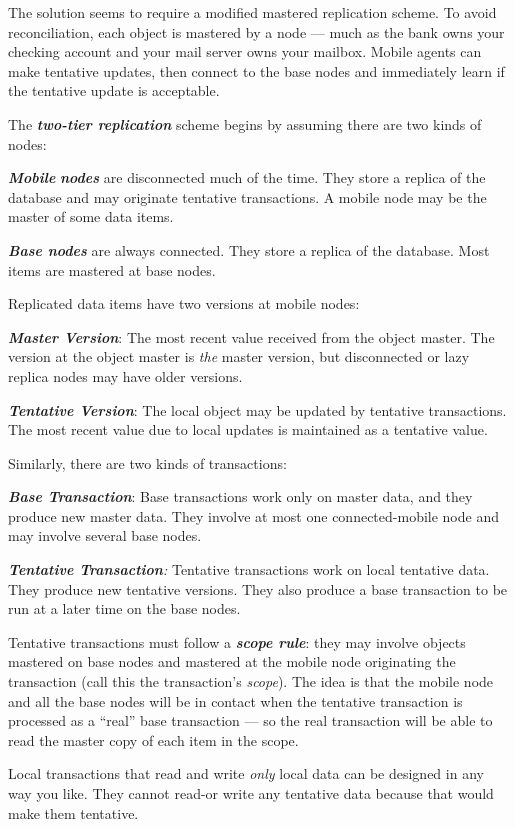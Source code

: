 \documentclass[a4paper,12pt,twoside,openright]{article}
\begin{document}
The solution seems to require a modified mastered replication scheme. To
avoid reconciliation, each object is mastered by a node --- much as the
bank owns your checking account and your mail server owns your mailbox.
Mobile agents can make tentative updates, then connect to the base nodes
and immediately learn if the tentative update is acceptable.

The \emph{\textbf{two-tier replication}} scheme begins by assuming there
are two kinds of nodes:

\emph{\textbf{Mobile}} \emph{\textbf{nodes}} are disconnected much of
the time. They store a replica of the database and may originate
tentative transactions. A mobile node may be the master of some data
items.

\emph{\textbf{Base nodes}} are always connected. They store a replica of
the database. Most items are mastered at base nodes.

Replicated data items have two versions at mobile nodes:

\emph{\textbf{Master Version}}: The most recent value received from the
object master. The version at the object master is \emph{the} master
version, but disconnected or lazy replica nodes may have older versions.

\emph{\textbf{Tentative Version}}: The local object may be updated by
tentative transactions. The most recent value due to local updates is
maintained as a tentative value.

Similarly, there are two kinds of transactions:

\emph{\textbf{Base Transaction}}: Base transactions work only on master
data, and they produce new master data. They involve at most one
connected-mobile node and may involve several base nodes.

\emph{\textbf{Tentative Transaction}:} Tentative transactions work on
local tentative data. They produce new tentative versions. They also
produce a base transaction to be run at a later time on the base nodes.

Tentative transactions must follow a \emph{\textbf{scope rule}}: they
may involve objects mastered on base nodes and mastered at the mobile
node originating the transaction (call this the transaction's
\emph{scope}). The idea is that the mobile node and all the base nodes
will be in contact when the tentative transaction is processed as a
``real'' base transaction --- so the real transaction will be able to
read the master copy of each item in the scope.

Local transactions that read and write \emph{only} local data can be
designed in any way you like. They cannot read-or write any tentative
data because that would make them tentative.
\end{document}
